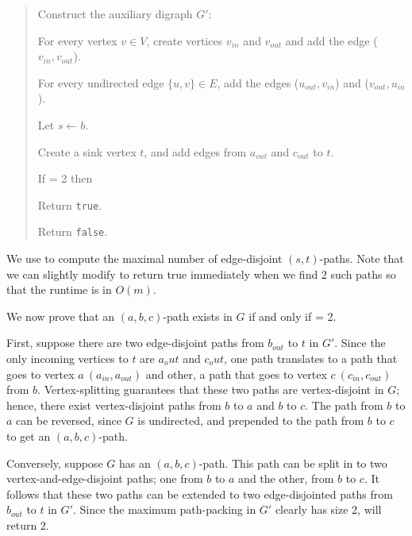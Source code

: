 \documentclass{article}
\begin{document}
\begin{solution}
\begin{quote}
\begin{steps}
    \item Construct the auxiliary digraph $G'$:
    \begin{steps}
        \item For every vertex $v \in V$, create vertices $v_{in}$ and $v_{out}$ and add the edge ($v_{in}, v_{out}$).
        \item For every undirected edge $\{u,v\} \in E$, add the edges ($u_{out}, v_{in}$) and ($v_{out}, u_{in}$).
        \item Let $s \leftarrow b$.
        \item Create a sink vertex $t$, and add edges from $a_{out}$ and $c_{out}$ to $t$.
    \end{steps}
    \item If  = 2 then
    \begin{steps}
        \item Return \texttt{true}.
    \end{steps}
  \item Return \texttt{false}.
\end{steps}
\end{quote}


\vspace{1cc}
\begin{subproof} [Runtime.]
We use  to compute the maximal number of edge-disjoint $(s,t)$-paths. Note that we can slightly modify  to return true immediately when we find 2 such paths so that the runtime is in $O(m)$.
\end{subproof}


\begin{subproof} [Correctness.]
We now prove that an $(a,b,c)$-path exists in $G$ if and only if  = 2.

First, suppose there are two edge-disjoint paths from $b_{out}$ to $t$ in $G'$.
Since the only incoming vertices to $t$ are $a_out$ and $c_out$, one path translates to a path that goes to vertex $a \ (a_{in}, a_{out})$ and other, a path that goes to vertex $c \ (c_{in}, c_{out})$ from $b$. Vertex-splitting guarantees that these two paths are vertex-disjoint in $G$; hence, there exist vertex-disjoint paths from $b$ to $a$ and $b$ to $c$. The path from $b$ to $a$ can be reversed, since $G$ is undirected, and prepended to the path from $b$ to $c$ to get an $(a, b, c)$-path.

Conversely, suppose $G$ has an $(a,b,c)$-path.
This path can be split in to two vertex-and-edge-disjoint paths; one from $b$ to $a$ and the other, from $b$ to $c$. It follows that these two paths can be extended to two edge-disjointed paths from $b_{out}$ to $t$ in $G'$. Since the maximum path-packing in $G'$ clearly has size 2,  will return 2.
\end{subproof}


\end{solution}
\pagebreak
\end{document}
